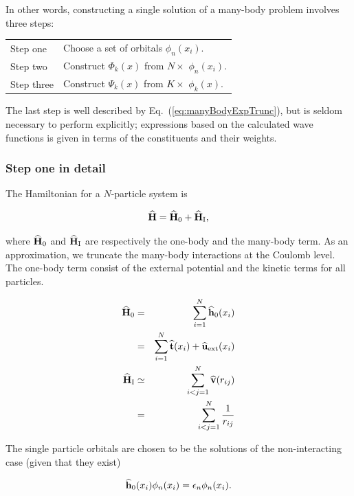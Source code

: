 In other words, constructing a single solution of a many-body problem involves three steps:

\begin{center}
\begin{tabular}{l|l}
 Step one   &  Choose a set of orbitals $\phi_n(x_i)$. \\
 Step two   &  Construct $\Phi_k(x)$ from $N\times$ $\phi_n(x_i)$.   \\
 Step three &  Construct $\Psi_k(x)$ from $K\times$ $\phi_k(x)$.     \\
\end{tabular}
\end{center}

The last step is well described by Eq.~(\ref{eq:manyBodyExpTrunc}), but is seldom necessary to perform explicitly; expressions based on the calculated wave functions is given in terms of the constituents and their weights.

\subsubsection{Step one in detail}

The Hamiltonian for a $N$-particle system is 

\begin{equation}
 {\bf\widehat{H}} = {\bf\widehat{H}}_0 + {\bf\widehat{H}}_\mathrm{I},
\end{equation}

where ${\bf\widehat{H}}_0$ and ${\bf\widehat{H}}_\mathrm{I}$ are respectively the one-body and the many-body term. As an approximation, we truncate the many-body interactions at the Coulomb level. The one-body term consist of the external potential and the kinetic terms for all particles.

\begin{eqnarray}
 {\bf\widehat{H}}_0 &=& \sum_{i=1}^N {\bf\widehat{h}}_0(x_i) \\
          &=& \sum_{i=1}^N {\bf\widehat{t}}(x_i) + {\bf\widehat{u}}_\mathrm{ext}(x_i) \nonumber\\
 {\bf\widehat{H}}_\mathrm{I} &\simeq& \sum_{i<j=1}^N {\bf\widehat{v}}(r_{ij}) \\
          &=& \sum_{i<j=1}^N \frac{1}{r_{ij}}  \nonumber
\end{eqnarray}

The single particle orbitals are chosen to be the solutions of the non-interacting case (given that they exist)

\begin{equation}
\label{eq:orbitalEigenEq}
 {\bf\widehat{h}}_0(x_i)\phi_n(x_i) = \epsilon_n\phi_n(x_i).
\end{equation}

